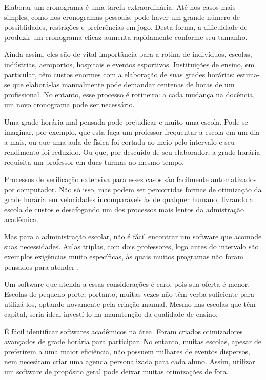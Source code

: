 \documentclass[12pt,a4paper]{article}
\begin{document}
			\par Elaborar um cronograma é uma tarefa extraordinária. Até nos casos mais simples, como nos cronogramas pessoais, pode haver um grande número de possiblidades, restrições e preferências em jogo. Desta forma, a dificuldade de produzir um cronograma eficaz aumenta rapidamente conforme seu tamanho.

			\par Ainda assim, eles são de vital importância para a rotina de indivíduos, escolas, indústrias, aeroportos, hospitais e eventos esportivos. Instituições de ensino, em particular, têm custos enormes com a elaboração de suas grades horárias: estima-se que elaborá-las manualmente pode demandar centenas de horas \cite{appleby} de um profissional. No entanto, esse processo é rotineiro: a cada mudança na docência, um novo cronograma pode ser necessário.

			\par Uma grade horária mal-pensada pode prejudicar e muito uma escola. Pode-se imaginar, por exemplo, que esta faça um professor frequentar a escola em um dia a mais, ou que uma aula de física foi cortada ao meio pelo intervalo e seu rendimento foi reduzido. Ou que, por descuido de seu elaborador, a grade horária requisita um professor em duas turmas ao mesmo tempo.

			\par Processos de verificação extensiva para esses casos são facilmente automatizados por computador. Não só isso, mas podem ser percorridas formas de otimização da grade horária em velocidades incomparáveis às de qualquer humano, livrando a escola de custos e desafogando um dos processos mais lentos da admistração acadêmica.

			\par Mas para a administração escolar, não é fácil encontrar um software que acomode suas necessidades. Aulas triplas, com dois professores, logo antes do intervalo são exemplos exigências muito específicas, às quais muitos programas não foram pensados para atender \cite{nikita}.

			\par Um software que atenda a essas considerações é caro, pois sua oferta é menor. Escolas de pequeno porte, portanto, muitas vezes não têm verba suficiente para utilizá-los, optando novamente pela criação manual. Mesmo nas escolas que têm capital, seria ideal investí-lo na manutenção da qualidade de ensino.

			\par É fácil identificar softwares acadêmicos na área. Foram criados otimizadores avançados de grade horária para participar. No entanto, muitas escolas, apesar de preferirem a uma maior eficiência, não possuem milhares de eventos dispersos, nem necesitam criar uma agenda personalizada para cada aluno. Assim, utilizar um software de propósito geral pode deixar muitas otimizações de fora.
\end{document}

